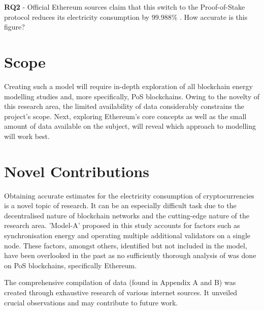 \textbf{RQ2} - Official Ethereum sources claim that this switch to the Proof-of-Stake protocol reduces its electricity consumption by 99.988\% \cite{EthereumEthereum.orgc}. How accurate is this figure?

\section{Scope}
Creating such a model will require in-depth exploration of all blockchain energy modelling studies and, more specifically, PoS blockchains. Owing to the novelty of this research area, the limited availability of data considerably constrains the project's scope. Next, exploring Ethereum's core concepts as well as the small amount of data available on the subject, will reveal which approach to modelling will work best.  


\section{Novel Contributions}
Obtaining accurate estimates for the electricity consumption of cryptocurrencies is a novel topic of research. It can be an especially difficult task due to the decentralised nature of blockchain networks and the cutting-edge nature of the research area. 'Model-A' proposed in this study accounts for factors such as synchronisation energy and operating multiple additional validators on a single node. These factors, amongst others, identified but not included in the model, have been overlooked in the past as no sufficiently thorough analysis of was done on PoS blockchains, specifically Ethereum.

The comprehensive compilation of data (found in Appendix A and B) was created through exhaustive research of various internet sources. It unveiled crucial observations and may contribute to future work.

